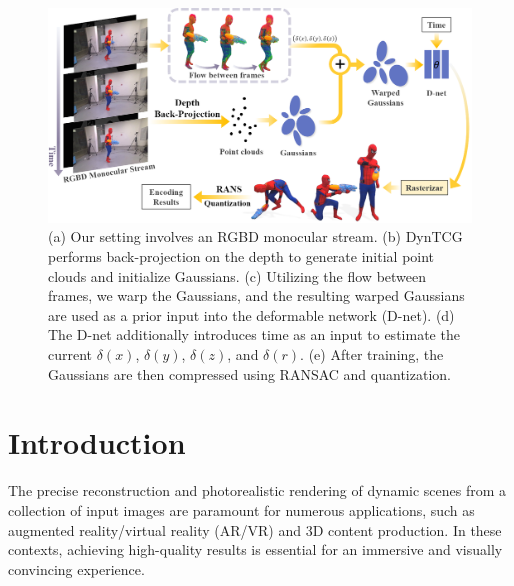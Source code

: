 
\begin{figure}[t] 
	\begin{center} 
		\includegraphics[width=\linewidth]{sec/fig/pipeline.png} 
	\end{center} 
    \vspace{-20pt}  
    \caption{ (a) Our setting involves an RGBD monocular stream. (b) DynTCG performs back-projection on the depth to generate initial point clouds and initialize Gaussians. (c) Utilizing the flow between frames, we warp the Gaussians, and the resulting warped Gaussians are used as a prior input into the deformable network (D-net). (d) The D-net additionally introduces time as an input to estimate the current $\delta(x)$, $\delta(y)$, $\delta(z)$, and $\delta(r)$. (e) After training, the Gaussians are then compressed using RANSAC and quantization.}
	\label{fig:fig_2_overview} 
	\vspace{-8pt}
\end{figure} 


\section{Introduction}
The precise reconstruction and photorealistic rendering of dynamic scenes from a collection of input images are paramount for numerous applications, such as augmented reality/virtual reality (AR/VR) and 3D content production. In these contexts, achieving high-quality results is essential for an immersive and visually convincing experience. 


